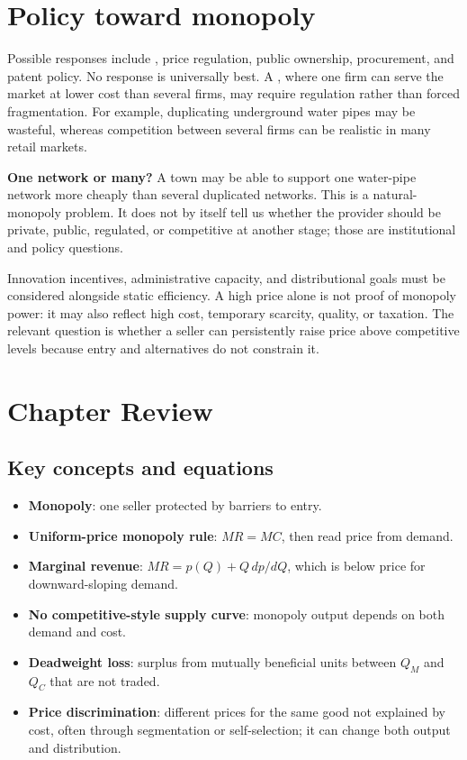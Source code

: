 \section{Policy toward monopoly}

Possible responses include , price regulation, public
ownership, procurement, and patent policy. No response is universally best. A
, where one firm can serve the market at lower cost
than several firms, may require regulation rather than forced fragmentation.
For example, duplicating underground water pipes may be wasteful, whereas
competition between several firms can be realistic in many retail markets.

\begin{exercisebox}
\textbf{One network or many?}
A town may be able to support one water-pipe network more cheaply than several
duplicated networks. This is a natural-monopoly problem. It does not by itself
tell us whether the provider should be private, public, regulated, or
competitive at another stage; those are institutional and policy questions.
\end{exercisebox}

Innovation incentives, administrative capacity, and distributional goals must
be considered alongside static efficiency. A high price alone is not proof of
monopoly power: it may also reflect high cost, temporary scarcity, quality, or
taxation. The relevant question is whether a seller can persistently raise price
above competitive levels because entry and alternatives do not constrain it.

\section*{Chapter Review}

\subsection*{Key concepts and equations}
\begin{itemize}
  \item \textbf{Monopoly}: one seller protected by barriers to entry.
  \item \textbf{Uniform-price monopoly rule}: $MR=MC$, then read price from demand.
  \item \textbf{Marginal revenue}: $MR=p(Q)+Q\,dp/dQ$, which is below price for downward-sloping demand.
  \item \textbf{No competitive-style supply curve}: monopoly output depends on both demand and cost.
  \item \textbf{Deadweight loss}: surplus from mutually beneficial units between $Q_M$ and $Q_C$ that are not traded.
  \item \textbf{Price discrimination}: different prices for the same good not
  explained by cost, often through segmentation or self-selection; it can
  change both output and distribution.
\end{itemize}

